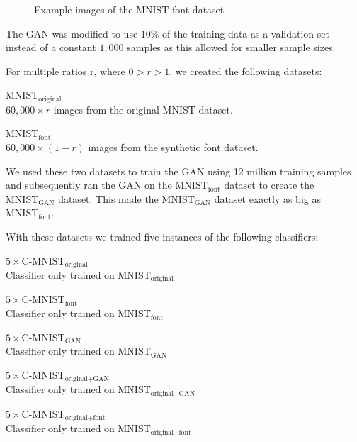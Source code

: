\documentclass[10pt,twocolumn,letterpaper]{article}
\begin{document}
\begin{figure}[t]
\begin{center}
\end{center}
   \caption{Example images of the MNIST font dataset}
\label{fig:example-font-images}
\end{figure}

The GAN was modified to use $10\%$ of the training data as a validation set instead of a constant $1,000$ samples as this allowed for smaller sample sizes.

For multiple ratios r, where $0 > r > 1$, we created the following datasets:

\begin{description}
	\item{$\text{MNIST}_\text{original}$} \hfill \\ $60,000 \times r$ images from the original MNIST dataset.
	\item{$\text{MNIST}_\text{font}$} \hfill \\ $60,000 \times (1 - r)$ images from the synthetic font dataset.
\end{description}

We used these two datasets to train the GAN using 12 million training samples and subsequently ran the GAN on the $\text{MNIST}_\text{font}$ dataset to create the $\text{MNIST}_\text{GAN}$ dataset. This made the $\text{MNIST}_\text{GAN}$ dataset exactly as big as $\text{MNIST}_\text{font}$.


With these datasets we trained five instances of the following classifiers:

\begin{description}
	\item{$5\times \text{C-MNIST}_\text{original}$} \hfill \\ Classifier only trained on $\text{MNIST}_\text{original}$
	\item{$5\times \text{C-MNIST}_\text{font}$} \hfill \\ Classifier only trained on $\text{MNIST}_\text{font}$
	\item{$5\times \text{C-MNIST}_\text{GAN}$} \hfill \\ Classifier only trained on $\text{MNIST}_\text{GAN}$
	\item{$5\times \text{C-MNIST}_\text{original+GAN}$} \hfill \\ Classifier only trained on $\text{MNIST}_\text{original+GAN}$
	\item{$5\times \text{C-MNIST}_\text{original+font}$} \hfill \\ Classifier only trained on $\text{MNIST}_\text{original+font}$
\end{description}
\end{document}
